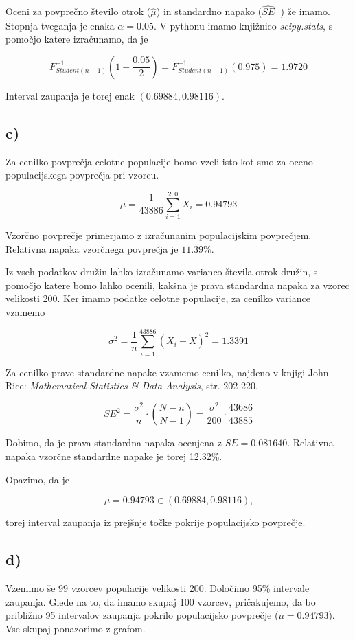 \documentclass[12pt, a4paper]{article}
\begin{document}
Oceni za povprečno število otrok ($\hat{\mu}$) in standardno napako ($\widehat{SE}_+$) 
že imamo. Stopnja tveganja je enaka $\alpha = 0.05$. V pythonu imamo knjižnico
\emph{scipy.stats}, s pomočjo katere izračunamo, da je 

$$ F^{-1}_{Student(n-1)}(1 - \frac{0.05}{2}) = F^{-1}_{Student(n-1)}(0.975) = 1.9720
$$

Interval zaupanja je torej enak $(0.69884, 0.98116)$.

\subsection*{c)}

Za cenilko povprečja celotne populacije bomo vzeli isto kot smo za oceno populacijskega
povprečja pri vzorcu. 

$$ \mu = \frac{1}{43886}\sum^{200}_{i=1} X_i = 0.94793
$$

Vzorčno povprečje primerjamo z izračunanim populacijskim povprečjem. Relativna
 napaka vzorčnega povprečja je $11.39\%$. 

Iz vseh podatkov družin lahko izračunamo varianco števila otrok družin, s pomočjo
katere bomo lahko ocenili, kakšna je prava standardna napaka za vzorec velikosti 200.
Ker imamo podatke celotne populacije, za cenilko variance vzamemo

$$ \sigma^2 = \frac{1}{n} \sum_{i=1}^{43886} (X_i - \bar{X})^2 = 1.3391
$$

Za cenilko prave standardne napake vzamemo cenilko, najdeno v knjigi John Rice:
\emph{Mathematical Statistics \& Data Analysis}, str. 202-220. 

$$ SE^2 = \frac{\sigma^2}{n} \cdot (\frac{N-n}{N-1}) = \frac{\sigma^2}{200} \cdot \frac{43686}{43885}
$$

Dobimo, da je prava standardna napaka ocenjena z $SE = 0.081640$. Relativna napaka
vzorčne standardne napake je torej 12.32\%.

Opazimo, da je

$$ \mu = 0.94793 \in (0.69884, 0.98116) \text{,}
$$

torej interval zaupanja iz prejšnje točke pokrije populacijsko povprečje.

\subsection*{d)}

Vzemimo še 99 vzorcev populacije velikosti 200. Določimo 95\% intervale zaupanja. 
Glede na to, da imamo skupaj 100
vzorcev, pričakujemo, da bo približno 95 intervalov zaupanja pokrilo populacijsko
povprečje ($\mu = 0.94793$). Vse skupaj ponazorimo z grafom.
\end{document}
